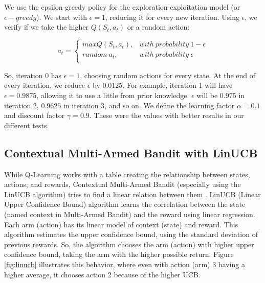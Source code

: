 We use the epsilon-greedy policy for the exploration-exploitation model (or $\epsilon-greedy$). We start with $\epsilon = 1$, reducing it for every new iteration. Using $\epsilon$, we verify if we take the higher $Q(S_t, a_t)$ or a random action:

\begin{equation}
    a_t = \begin{cases}
        max Q(S_t, a_t), & with\ probability\ 1 - \epsilon \\
        random\ a_t, & with\ probability\ \epsilon \\
    \end{cases}
\end{equation}

So, iteration 0 has $\epsilon = 1$, choosing random actions for every state. At the end of every iteration, we reduce $\epsilon$ by $0.0125$. For example, iteration 1 will have $\epsilon = 0.9875$, allowing it to use a little from prior knowledge. $\epsilon$ will be $0.975$ in iteration 2, $0.9625$ in iteration 3, and so on. We define the learning factor $\alpha = 0.1$ and discount factor $\gamma = 0.9$. These were the values with better results in our different tests.

\subsection{Contextual Multi-Armed Bandit with LinUCB}

While Q-Learning works with a table creating the relationship between states, actions, and rewards, Contextual Multi-Armed Bandit (especially using the LinUCB algorithm) tries to find a linear relation between them \cite{li2010contextual}. LinUCB (Linear Upper Confidence Bound) algorithm learns the correlation between the state (named context in Multi-Armed Bandit) and the reward using linear regression. Each arm (action) has its linear model of context (state) and reward. This algorithm estimates the upper confidence bound, using the standard deviation of previous rewards. So, the algorithm chooses the arm (action) with higher upper confidence bound, taking the arm with the higher possible return. Figure \ref{fig:linucb} illustrates this behavior, where even with action (arm) 3 having a higher average, it chooses action 2 because of the higher UCB.

